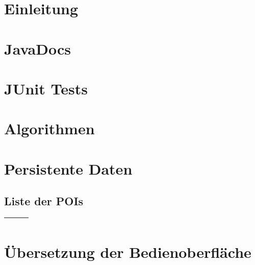 \documentclass[10pt]{scrreprt}
\begin{document}
\pagebreak
\rmfamily
\tableofcontents

\chapter{Einleitung}

\chapter{JavaDocs}

\chapter{JUnit Tests}

\chapter{Algorithmen}

\chapter{Persistente Daten}

\section{Liste der POIs}

\vspace{1.5 cm}
\begin{tabular}{|c|c|c|}
\hline 
\rule[-1ex]{0pt}{4ex} \textbf{} & \textbf{} & \textbf{} \\ 
\hline  \hline
\end{tabular}


\chapter{Übersetzung der Bedienoberfläche}
\end{document}
